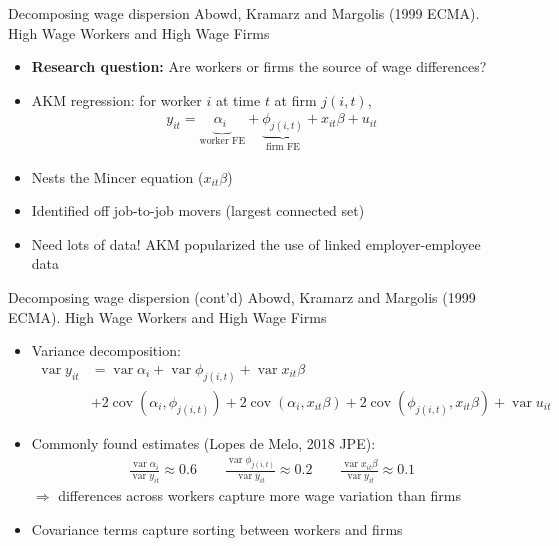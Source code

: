 \documentclass[aspectratio=169,compress,t,xcolor=table]{beamer}
\DeclareMathOperator{\var}{var}                            %
\DeclareMathOperator{\cov}{cov}                            %
\begin{document}
\begin{frame}{Decomposing wage dispersion}
Abowd, Kramarz and Margolis (1999 ECMA). High Wage Workers and High Wage Firms
  \begin{itemize}
    \vfill\item {\color{MyStructure}\textbf{Research question:}} Are workers or firms the source of wage differences?
    \vfill\item AKM regression: for worker \(i\) at time \(t\) at firm \(j(i,t)\),
    \begin{align*}
       y_{it} = \underbrace{\alpha_{i\phantom{j}}}_{\text{worker FE}} + \underbrace{\phi_{j(i,t)}}_{\text{firm FE}} + x_{it} \beta + u_{it}
    \end{align*}
    \vfill\item Nests the Mincer equation (\(x_{it} \beta\))
    \vfill\item Identified off job-to-job movers (largest connected set)
    \vfill\item Need lots of data! AKM popularized the use of linked employer-employee data
  \end{itemize}
\end{frame}

\begin{frame}{Decomposing wage dispersion (cont'd)}
Abowd, Kramarz and Margolis (1999 ECMA). High Wage Workers and High Wage Firms
  \begin{itemize}
    \vfill\item Variance decomposition: \pause
    \begin{align*}
       \var y_{it} &= \var \alpha_i + \var \phi_{j(i,t)} + \var x_{it} \beta \\
       &+ 2 \cov (\alpha_i, \phi_{j(i,t)}) + 2 \cov (\alpha_i, x_{it} \beta) + 2 \cov(\phi_{j(i,t)}, x_{it} \beta) + \var u_{it}
    \end{align*}
    \vfill\item Commonly found estimates (Lopes de Melo, 2018 JPE):
    \begin{align*}
      \frac{\var \alpha_i}{\var y_{it}} \approx 0.6 \qquad \frac{\var \phi_{j(i,t)}}{\var y_{it}} \approx 0.2 \qquad \frac{\var x_{it}\beta}{\var y_{it}} \approx 0.1
    \end{align*}
    \(\Rightarrow\) differences across workers capture more wage variation than firms
    \vfill\item Covariance terms capture sorting between workers and firms
  \end{itemize}
\end{frame}
\end{document}
